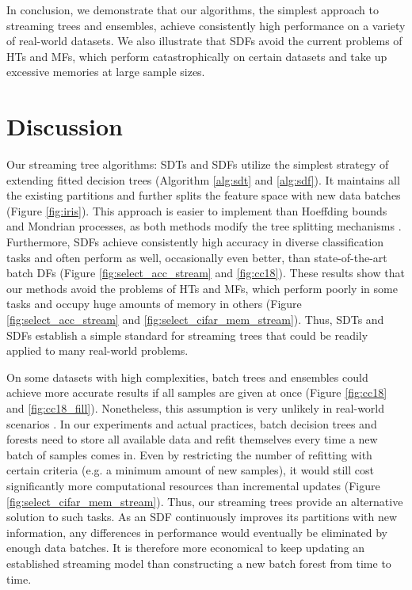 In conclusion, we demonstrate that our algorithms, the simplest approach to streaming trees and ensembles, achieve consistently high performance on a variety of real-world datasets. 
We also illustrate that SDFs avoid the current problems of HTs and MFs, which perform catastrophically on certain datasets and take up excessive memories at large sample sizes. 

\section{Discussion}
\label{discussion}
Our streaming tree algorithms: SDTs and SDFs utilize the simplest strategy of extending fitted decision trees (Algorithm \ref{alg:sdt} and \ref{alg:sdf}). It maintains all the existing partitions and further splits the feature space with new data batches (Figure \ref{fig:iris}). This approach is easier to implement than Hoeffding bounds and Mondrian processes, as both methods modify the tree splitting mechanisms \citep{hoeffding_probability_1994, domingos_mining_2000, roy_mondrian_2009, lakshminarayanan_mondrian_2014}. 
Furthermore, SDFs achieve consistently high accuracy in diverse classification tasks and often perform as well, occasionally even better, than state-of-the-art batch DFs (Figure \ref{fig:select_acc_stream} and \ref{fig:cc18}). These results show that our methods avoid the problems of HTs and MFs, which perform poorly in some tasks and occupy huge amounts of memory in others (Figure \ref{fig:select_acc_stream} and \ref{fig:select_cifar_mem_stream}). Thus, SDTs and SDFs establish a simple standard for streaming trees that could be readily applied to many real-world problems.

On some datasets with high complexities, batch trees and ensembles could achieve more accurate results if all samples are given at once (Figure \ref{fig:cc18} and \ref{fig:cc18_fill}). Nonetheless, this assumption is very unlikely in real-world scenarios \citep{abdulsalam_streaming_2007, liu_isolation_2008}. In our experiments and actual practices, batch decision trees and forests need to store all available data and refit themselves every time a new batch of samples comes in. Even by restricting the number of refitting with certain criteria (e.g. a minimum amount of new samples), it would still cost significantly more computational resources than incremental updates (Figure \ref{fig:select_cifar_mem_stream}). Thus, our streaming trees provide an alternative solution to such tasks. As an SDF continuously improves its partitions with new information, any differences in performance would eventually be eliminated by enough data batches. It is therefore more economical to keep updating an established streaming model than constructing a new batch forest from time to time.

